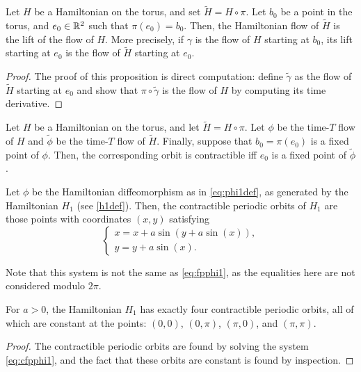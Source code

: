 \begin{prop}
Let $H$ be a Hamiltonian on the torus, and set $\tilde H = H \circ \pi$. Let $b_0$ be a point in the torus, and $e_0 \in \mathbb{R}^2$ such that $\pi(e_0) = b_0$. Then, the Hamiltonian flow of $\tilde H$ is the lift of the flow of $H$. More precisely, if $\gamma$ is the flow of $H$ starting at $b_0$, its lift starting at $e_0$ is the flow of $\tilde H$ starting at $e_0$.
\end{prop}

\begin{proof}
The proof of this proposition is direct computation: define $\tilde \gamma$ as the flow of $\tilde H$ starting at $e_0$ and show that $\pi \circ \tilde \gamma$ is the flow of $H$ by computing its time derivative.
\end{proof}

\begin{corollary}\label{cor:liftham}
Let $H$ be a Hamiltonian on the torus, and let $\tilde H = H \circ \pi$. Let $\phi$ be the time-$T$ flow of $H$ and $\tilde \phi$ be the time-$T$ flow of $\tilde H$. Finally, suppose that $b_0 = \pi(e_0)$ is a fixed point of $\phi$. Then, the corresponding orbit is contractible iff $e_0$ is a fixed point of $\tilde\phi$.
\end{corollary}

\begin{corollary}
Let $\phi$ be the Hamiltonian diffeomorphism as in \eqref{eq:phi1def}, as generated by the Hamiltonian $H_1$ (see \eqref{h1def}). Then, the contractible periodic orbits of $H_1$	 are those points with coordinates $(x,y)$ satisfying
\begin{equation}\label{eq:cfpphi1}
\begin{cases}
x = x + a \sin(y + a \sin(x)),\\
y = y + a \sin(x).
\end{cases}
\end{equation}

Note that this system is not the same as \eqref{eq:fpphi1}, as the equalities here are not considered modulo $2\pi$.	
\end{corollary}

\begin{prop}
For $a > 0$, the Hamiltonian $H_1$ has exactly four contractible periodic orbits, all of which are constant at the points: $(0,0)$, $(0,\pi)$, $(\pi,0)$, and $(\pi,\pi)$.
\end{prop}

\begin{proof}
The contractible periodic orbits are found by solving the system \eqref{eq:cfpphi1}, and the fact that these orbits are constant is found by inspection.
\end{proof}


